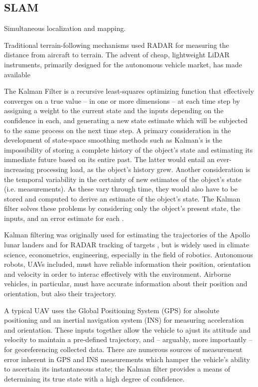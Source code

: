 \documentclass[10pt,a4paper]{report}
\begin{document}
\subsection{SLAM}

Simultaneous localization and mapping.

Traditional terrain-following mechanisms used RADAR for measuring the distance from aircraft to terrain. The advent of cheap, lightweight LiDAR instruments, primarily designed for the autonomous vehicle market, has made available 


The Kalman Filter \cite{Kalman1960} is a recursive least-squares optimizing function that effectively converges on a true value -- in one or more dimensions -- at each time step by assigning a weight to the current state and the inputs depending on the confidence in each, and generating a new state estimate which will be subjected to the same process on the next time step. A primary consideration in the development of state-space smoothing methods such as Kalman's is the impossibility of storing a complete history of the object's state and estimating its immediate future based on its entire past. The latter would entail an ever-increasing processing load, as the object's history grew. Another consideration is the temporal variability in the certainty of new estimates of the object's state (i.e. measurements). As these vary through time, they would also have to be stored and computed to derive an estimate of the object's state. The Kalman filter solves these problems by considering only the object's present state, the inputs, and an error estimate for each \cite{Swerling1959}. 

Kalman filtering was originally used for estimating the trajectories of the Apollo lunar landers and for RADAR tracking of targets \cite{Grewal2010}, but is widely used in climate science, econometrics, engineering, especially in the field of robotics. Autonomous robots, UAVs included, must have reliable information their position, orientation and velocity in order to interac effectively with the environment. Airborne vehicles, in particular, must have accurate information about their position and orientation, but also their trajectory.

A typical UAV uses the Global Positioning System (GPS) for absolute positioning and an inertial navigation system (INS) for measuring acceleration and orientation. These inputs together allow the vehicle to ajust its attitude and velocity to maintain a pre-defined trajectory, and -- arguably, more importantly -- for georeferencing collected data. There are numerous sources of measurement error inherent in GPS and INS measurements which hamper the vehicle's ability to ascertain its instantaneous state; the Kalman filter provides a means of determining its true state with a high degree of confidence.
\end{document}
